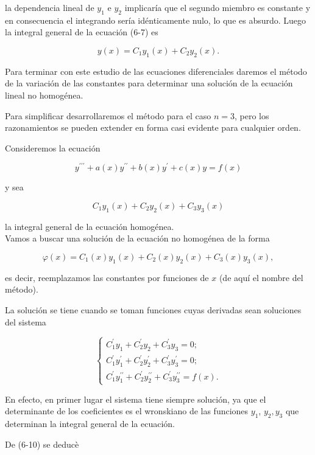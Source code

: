 \documentclass[10pt]{article}
\theoremstyle{plain}
\theoremstyle{definition}
\theoremstyle{remark}
\begin{document}
la dependencia lineal de $y_{1}$ e $y_{2}$ implicaría que el segundo miembro es constante y en consecuencia el integrando sería idénticamente nulo, lo que es absurdo. Luego la integral general de la ecuación (6-7) es

$$
y(x)=C_{1} y_{1}(x)+C_{2} y_{2}(x) .
$$

Para terminar con este estudio de las ecuaciones diferenciales daremos el método de la variación de las constantes para determinar una solución de la ecuación lineal no homogénea.

Para simplificar desarrollaremos el método para el caso $n=3$, pero los razonamientos se pueden extender en forma casi evidente para cualquier orden.

Consideremos la ecuación


\begin{equation*}
y^{\prime \prime \prime}+a(x) y^{\prime \prime}+b(x) y^{\prime}+c(x) y=f(x) \tag{6-9}
\end{equation*}


y sea

$$
C_{1} y_{1}(x)+C_{2} y_{2}(x)+C_{3} y_{3}(x)
$$

la integral general de la ecuación homogénea.\\
Vamos a buscar una solución de la ecuación no homogénea de la forma

$$
\varphi(x)=C_{1}(x) y_{1}(x)+C_{2}(x) y_{2}(x)+C_{3}(x) y_{3}(x),
$$

es decir, reemplazamos las constantes por funciones de $x$ (de aquí el nombre del método).

La solución se tiene cuando se toman funciones cuyas derivadas sean soluciones del sistema

\[
\left\{\begin{array}{l}
C_{1}^{\prime} y_{1}+C_{2}^{\prime} y_{2}+C_{3}^{\prime} y_{3}=0 ;  \tag{6-10}\\
C_{1}^{\prime} y_{1}^{\prime}+C_{2}^{\prime} y_{2}^{\prime}+C_{3}^{\prime} y_{3}^{\prime}=0 ; \\
C_{1}^{\prime} y_{1}^{\prime \prime}+C_{2}^{\prime} y_{2}^{\prime \prime}+C_{3}^{\prime} y_{3}^{\prime \prime}=f(x) .
\end{array}\right.
\]

En efecto, en primer lugar el sistema tiene siempre solución, ya que el determinante de los coeficientes es el wronskiano de las funciones $y_{1}$, $y_{2}, y_{3}$ que determinan la integral general de la ecuación.

De (6-10) se deducè
\end{document}
